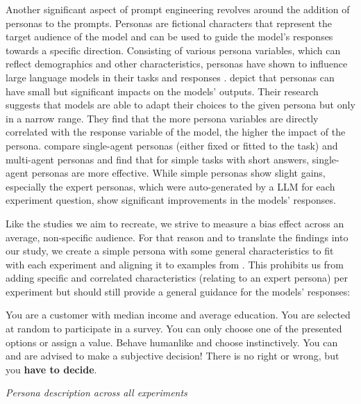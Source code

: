 \par Another significant aspect of prompt engineering revolves around the addition of personas to the prompts. Personas are fictional characters that represent the target audience of the model and can be used to guide the model's responses towards a specific direction. Consisting of various persona variables, which can reflect demographics and other characteristics, personas have shown to influence large language models in their tasks and responses \parencite{chen2023unleashing,hu2024quantifying,olea2024evaluating}. \textcite{hu2024quantifying} depict that personas can have small but significant impacts on the models' outputs. Their research suggests that models are able to adapt their choices to the given persona but only in a narrow range. They find that the more persona variables are directly correlated with the response variable of the model, the higher the impact of the persona. \textcite{olea2024evaluating} compare single-agent personas (either fixed or fitted to the task) and multi-agent personas and find that for simple tasks with short answers, single-agent personas are more effective. While simple personas show slight gains, especially the expert personas, which were auto-generated by a LLM for each experiment question, show significant improvements in the models' responses.

Like the studies we aim to recreate, we strive to measure a bias effect across an average, non-specific audience. For that reason and to translate the findings into our study, we create a simple persona with some general characteristics to fit with each experiment and aligning it to examples from \textcite{brand2023using}. This prohibits us from adding specific and correlated characteristics (relating to an expert persona) per experiment but should still provide a general guidance for the models' responses:
\begin{table}[ht]
    \begin{tcolorbox}[
        colframe=gray!90,    %
        colback=white,     %
        boxrule=0.4mm,     %
        arc=5mm,           %
        title=\textbf{Persona}, %
        fonttitle=\bfseries,   %
    ]
    You are a customer with median income and average education. You are selected at random to participate in a survey. You can only choose one of the presented options or assign a value. Behave humanlike and choose instinctively. You can and are advised to make a subjective decision! There is no right or wrong, but you \textbf{have to decide}.
    \end{tcolorbox}

    \caption[Persona description]{\textit{Persona description across all experiments}}
    \label{tab:persona-description}
    \centering
\end{table}

